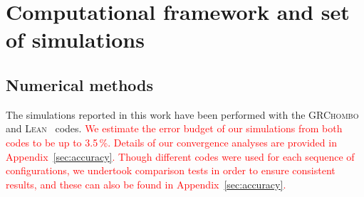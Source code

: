 \documentclass[floats,floatfix,showpacs,amssymb,prd,twocolumn,superscriptaddress,nofootinbib,nolongbibliography,reprint]{revtex4-2}
\newcommand{\mr}[1]{{\textcolor{cyan}{\sf{[MR: #1]}} }}
\newcommand{\eb}[1]{{\textcolor{blue}{\sf{[EB: #1]}} }}
\newcommand{\new}[1]{{\textcolor{red}{ #1} }}
\begin{document}
\section{Computational framework and set of simulations}
\label{sec:NR}
% 
\subsection{Numerical methods}

The simulations reported in this work have been performed with the
\textsc{GRChombo}~\cite{Clough:2015sqa, GRChomboWebsite} and 
\textsc{Lean}~\cite{Sperhake:2006cy} codes.
\new{We estimate the error budget of our simulations from both codes to be up to 3.5\,\%. Details of our convergence analyses are provided in 
Appendix~\ref{sec:accuracy}. Though different codes were
used for each sequence of configurations, we undertook comparison tests 
in order to ensure consistent results, and these can also be found in
Appendix~\ref{sec:accuracy}.}
\end{document}
